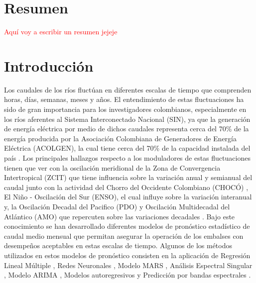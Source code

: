 \documentclass[draft]{agujournal2019}
\begin{document}
%
%

\section*{Resumen}

\textcolor{red}{Aquí voy a escribir un resumen jejeje}

\section{Introducción}


Los caudales de los ríos fluctúan en diferentes escalas de tiempo que comprenden horas, días, semanas, meses y años. El entendimiento de estas fluctuaciones ha sido de gran importancia para los investigadores colombianos, especialmente en los ríos aferentes al Sistema Interconectado Nacional (SIN), ya que la generación de energía eléctrica por medio de dichos caudales representa cerca del 70\% de la energía producida por la Asociación Colombiana de Generadores de Energía Eléctrica (ACOLGEN), la cual tiene cerca del 70\% de la capacidad instalada del país \cite{Acolgen_2022}. Los principales hallazgos respecto a los moduladores de estas fluctuaciones tienen que ver con la oscilación meridional de la Zona de Convergencia Intertropical (ZCIT) que tiene influencia sobre la variación anual y semianual del caudal \cite{Mejia_et_al_1999} junto con la actividad del Chorro del Occidente Colombiano (CHOCÓ) \cite{Poveda_and_Mesa_2000}, El Niño - Oscilación del Sur (ENSO), el cual influye sobre la variación interanual \cite{Arias_et_al_2021,Poveda_et_al_2020,Poveda_et_al_2011} y, la Oscilación Decadal del Pacifico (PDO) y Oscilación Multidecadal del Atlántico (AMO) que repercuten sobre las variaciones decadales \cite{Poveda_2004}. Bajo este conocimiento se han desarrollado diferentes modelos de pronóstico estadístico de caudal medio mensual que permitan asegurar la operación de los embalses con desempeños aceptables en estas escalas de tiempo. Algunos de los métodos utilizados en estos modelos de pronóstico consisten en la aplicación de Regresión Lineal Múltiple \cite{Poveda_et_al_2002_predict}, Redes Neuronales \cite{Poveda_et_al_2002_predict}, Modelo MARS \cite{Poveda_et_al_2002_predict, Sanchez_and_Poveda_2006}, Análisis Espectral Singular \cite{Carvajal_et_al_1998,Rojo_and_Carvajal_2010}, Modelo ARIMA \cite{Sanchez_and_Poveda_2006}, Modelos autoregresivos \cite{Salazar_Velasquez_Mesa_Sanchez_1994} y Predicción por bandas espectrales \cite{Poveda_et_al_2002_predict}.
\end{document}
